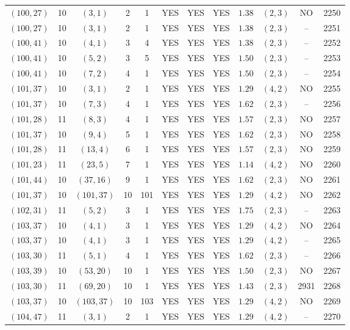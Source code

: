 \begin{longtable}{|c|c|c|c|c|c|c|c|c|c|c|c|}
$(100,27)$ & 10 & $(3,1)$ & 2 & 1 & YES & YES & YES & $1.38$ & $(2,3)$ & NO & 2250\\
$(100,27)$ & 10 & $(3,1)$ & 2 & 1 & YES & YES & YES & $1.38$ & $(2,3)$ & -- & 2251\\
$(100,41)$ & 10 & $(4,1)$ & 3 & 4 & YES & YES & YES & $1.38$ & $(2,3)$ & -- & 2252\\
$(100,41)$ & 10 & $(5,2)$ & 3 & 5 & YES & YES & YES & $1.50$ & $(2,3)$ & -- & 2253\\
$(100,41)$ & 10 & $(7,2)$ & 4 & 1 & YES & YES & YES & $1.50$ & $(2,3)$ & -- & 2254\\
$(101,37)$ & 10 & $(3,1)$ & 2 & 1 & YES & YES & YES & $1.29$ & $(4,2)$ & NO & 2255\\
$(101,37)$ & 10 & $(7,3)$ & 4 & 1 & YES & YES & YES & $1.62$ & $(2,3)$ & -- & 2256\\
$(101,28)$ & 11 & $(8,3)$ & 4 & 1 & YES & YES & YES & $1.57$ & $(2,3)$ & NO & 2257\\
$(101,37)$ & 10 & $(9,4)$ & 5 & 1 & YES & YES & YES & $1.62$ & $(2,3)$ & NO & 2258\\
$(101,28)$ & 11 & $(13,4)$ & 6 & 1 & YES & YES & YES & $1.57$ & $(2,3)$ & NO & 2259\\
$(101,23)$ & 11 & $(23,5)$ & 7 & 1 & YES & YES & YES & $1.14$ & $(4,2)$ & NO & 2260\\
$(101,44)$ & 10 & $(37,16)$ & 9 & 1 & YES & YES & YES & $1.62$ & $(2,3)$ & NO & 2261\\
$(101,37)$ & 10 & $(101,37)$ & 10 & 101 & YES & YES & YES & $1.29$ & $(4,2)$ & NO & 2262\\
$(102,31)$ & 11 & $(5,2)$ & 3 & 1 & YES & YES & YES & $1.75$ & $(2,3)$ & -- & 2263\\
$(103,37)$ & 10 & $(4,1)$ & 3 & 1 & YES & YES & YES & $1.29$ & $(4,2)$ & NO & 2264\\
$(103,37)$ & 10 & $(4,1)$ & 3 & 1 & YES & YES & YES & $1.29$ & $(4,2)$ & -- & 2265\\
$(103,30)$ & 11 & $(5,1)$ & 4 & 1 & YES & YES & YES & $1.62$ & $(2,3)$ & -- & 2266\\
$(103,39)$ & 10 & $(53,20)$ & 10 & 1 & YES & YES & YES & $1.50$ & $(2,3)$ & NO & 2267\\
$(103,30)$ & 11 & $(69,20)$ & 10 & 1 & YES & YES & YES & $1.43$ & $(2,3)$ & 2931 & 2268\\
$(103,37)$ & 10 & $(103,37)$ & 10 & 103 & YES & YES & YES & $1.29$ & $(4,2)$ & NO & 2269\\
$(104,47)$ & 11 & $(3,1)$ & 2 & 1 & YES & YES & YES & $1.29$ & $(4,2)$ & -- & 2270\\

\end{longtable}
